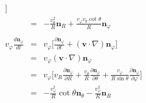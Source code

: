 \begin{solution}
\begin{enumerate}
\begin{multicols}{2}
\begin{eqnarray}
\Big]
\nonumber\\
& = & -\frac{v_\theta^2}{R}\mathbf{n}_R + \frac{v_\varphi v_\theta \cot\theta}{R}\mathbf{n}_\varphi
%
\nonumber\\
\nonumber\\
%
v_\varphi\frac{d\mathbf{n}_\varphi}{dt} & = & v_\varphi\Big[\frac{\partial\mathbf{n}_\varphi}{\partial t} + (\mathbf{v}\cdot \nabla)\mathbf{n}_\varphi\Big]\nonumber\\
 & = &  v_\varphi(\mathbf{v}\cdot \nabla)\mathbf{n}_\varphi
\nonumber\\
& = & v_\varphi\Big[
v_R\frac{\partial \mathbf{n}_\varphi}{\partial R} + \frac{v_\theta}{R}\frac{\partial\mathbf{n}_\varphi}{\partial\theta}
+ \frac{v_\varphi}{R\sin\theta}\frac{\partial\mathbf{n}_\varphi}{\partial\varphi}
\Big]
\nonumber\\
& = & -\frac{v_\varphi^2}{R}\cot\theta\mathbf{n}_\theta - \frac{v_\varphi^2}{R}\mathbf{n}_R
\nonumber
\end{eqnarray}


\end{multicols}
\end{enumerate}
\end{solution}
